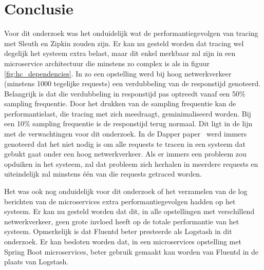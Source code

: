 
\chapter{Conclusie}
\label{ch:conclusie}


Voor dit onderzoek was het onduidelijk wat de performantiegevolgen van tracing met Sleuth en Zipkin zouden zijn. Er kan nu gesteld worden dat tracing wel degelijk het systeem extra belast, maar dit enkel merkbaar zal zijn in een microservice architectuur die minstens zo complex is als in figuur \ref{fig:hc_dependencies}. In zo een opstelling werd bij hoog netwerkverkeer (minstens 1000 tegelijke requests) een verdubbeling van de responstijd genoteerd. Belangrijk is dat die verdubbeling in responstijd pas optreedt vanaf een 50\% sampling frequentie. Door het drukken van de sampling frequentie kan de performantielast, die tracing met zich meedraagt, geminimaliseerd worden. Bij een 10\% sampling frequentie is de responstijd terug normaal. Dit ligt in de lijn met de verwachtingen voor dit onderzoek. In de Dapper paper~\autocite{Sigelman2010} werd immers genoteerd dat het niet nodig is om alle requests te tracen in een systeem dat gebukt gaat onder een hoog netwerkverkeer. Als er immers een probleem zou opduiken in het systeem, zal dat probleem zich herhalen in meerdere requests en uiteindelijk zal minstens één van die requests getraced worden.

Het was ook nog onduidelijk voor dit onderzoek of het verzamelen van de log berichten van de microservices extra performantiegevolgen hadden op het systeem. Er kan nu gesteld worden dat dit, in alle opstellingen met verschillend netwerkverkeer, geen grote invloed heeft op de totale performantie van het systeem. Opmerkelijk is dat Fluentd beter presteerde als Logstash in dit onderzoek. Er kan besloten worden dat, in een microservices opstelling met Spring Boot microservices, beter gebruik gemaakt kan worden van Fluentd in de plaats van Logstash.